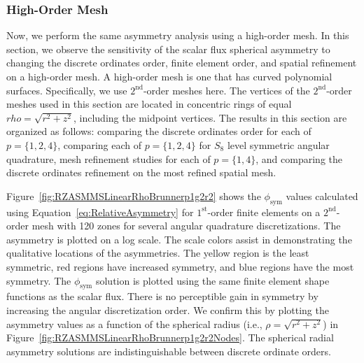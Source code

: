 \documentclass[12pt]{article}
\begin{document}
\FloatBarrier

\subsubsection{High-Order Mesh}
\label{subsec:HOMesh}
Now, we perform the same asymmetry analysis using a high-order mesh. In this section, we observe the sensitivity of the scalar flux spherical asymmetry to changing the discrete ordinates order, finite element order, and spatial refinement on a high-order mesh. A high-order mesh is one that has curved polynomial surfaces. Specifically, we use $2^\text{nd}$-order meshes here. The vertices of the $2^\text{nd}$-order meshes used in this section are located in concentric rings of equal $rho=\sqrt{r^2+z^2}$, including the midpoint vertices. The results in this section are organized as follows: comparing the discrete ordinates order for each of $p=\{1,2,4\}$, comparing each of $p=\{1,2,4\}$ for $S_8$ level symmetric angular quadrature, mesh refinement studies for each of $p=\{1,4\}$, and comparing the discrete ordinates refinement on the most refined spatial mesh.

Figure~\ref{fig:RZASMMSLinearRhoBrunnerp1g2r2} shows the $\phi_\text{sym}$ values calculated using Equation~\ref{eq:RelativeAsymmetry} for $1^\text{st}$-order finite elements on a $2^\text{nd}$-order mesh with 120 zones for several angular quadrature discretizations. The asymmetry is plotted on a log scale. The scale colors assist in demonstrating the qualitative locations of the asymmetries. The yellow region is the least symmetric, red regions have increased symmetry, and blue regions have the most symmetry. The $\phi_\text{sym}$ solution is plotted using the same finite element shape functions as the scalar flux. There is no perceptible gain in symmetry by increasing the angular discretization order. We confirm this by plotting the asymmetry values as a function of the spherical radius (i.e., $\rho=\sqrt{r^2+z^2}$) in Figure~\ref{fig:RZASMMSLinearRhoBrunnerp1g2r2Nodes}. The spherical radial asymmetry solutions are indistinguishable between discrete ordinate orders.
\end{document}

